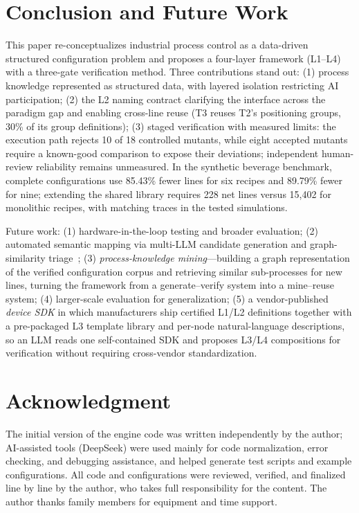 \documentclass[conference]{IEEEtran}
\begin{document}
\section{Conclusion and Future Work}

This paper re-conceptualizes industrial process control as a data-driven structured configuration problem and proposes a four-layer framework (L1--L4) with a three-gate verification method. Three contributions stand out: (1) process knowledge represented as structured data, with layered isolation restricting AI participation; (2) the L2 naming contract clarifying the interface across the paradigm gap and enabling cross-line reuse (T3 reuses T2's positioning groups, 30\% of its group definitions); (3) staged verification with measured limits: the execution path rejects 10 of 18 controlled mutants, while eight accepted mutants require a known-good comparison to expose their deviations; independent human-review reliability remains unmeasured. In the synthetic beverage benchmark, complete configurations use 85.43\% fewer lines for six recipes and 89.79\% fewer for nine; extending the shared library requires 228 net lines versus 15,402 for monolithic recipes, with matching traces in the tested simulations.

Future work: (1) hardware-in-the-loop testing and broader evaluation; (2) automated semantic mapping via multi-LLM candidate generation and graph-similarity triage~\cite{agents4plc}; (3) \emph{process-knowledge mining}---building a graph representation of the verified configuration corpus and retrieving similar sub-processes for new lines, turning the framework from a generate--verify system into a mine--reuse system; (4) larger-scale evaluation for generalization; (5) a vendor-published \emph{device SDK} in which manufacturers ship certified L1/L2 definitions together with a pre-packaged L3 template library and per-node natural-language descriptions, so an LLM reads one self-contained SDK and proposes L3/L4 compositions for verification without requiring cross-vendor standardization.

\section*{Acknowledgment}

The initial version of the engine code was written independently by the author; AI-assisted tools (DeepSeek) were used mainly for code normalization, error checking, and debugging assistance, and helped generate test scripts and example configurations. All code and configurations were reviewed, verified, and finalized line by line by the author, who takes full responsibility for the content. The author thanks family members for equipment and time support.
\end{document}
